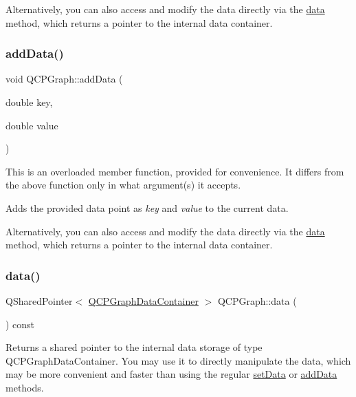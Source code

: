 Alternatively, you can also access and modify the data directly via the \hyperlink{classQCPGraph_a141aa31a1f19bbd0ce60f55eaeb9ea60}{data} method, which returns a pointer to the internal data container. \mbox{\label{classQCPGraph_a0bf98b1972286cfb7b1c4b7dd6ae2012}} 
\subsubsection{\texorpdfstring{add\+Data()}{addData()}\hspace{0.1cm}{\footnotesize\ttfamily [2/2]}}
{\footnotesize\ttfamily void Q\+C\+P\+Graph\+::add\+Data (\begin{DoxyParamCaption}\item[{double}]{key,  }\item[{double}]{value }\end{DoxyParamCaption})}

This is an overloaded member function, provided for convenience. It differs from the above function only in what argument(s) it accepts.

Adds the provided data point as {\itshape key} and {\itshape value} to the current data.

Alternatively, you can also access and modify the data directly via the \hyperlink{classQCPGraph_a141aa31a1f19bbd0ce60f55eaeb9ea60}{data} method, which returns a pointer to the internal data container. \mbox{\label{classQCPGraph_a141aa31a1f19bbd0ce60f55eaeb9ea60}} 
\subsubsection{\texorpdfstring{data()}{data()}}
{\footnotesize\ttfamily Q\+Shared\+Pointer$<$ \hyperlink{classQCPDataContainer}{Q\+C\+P\+Graph\+Data\+Container} $>$ Q\+C\+P\+Graph\+::data (\begin{DoxyParamCaption}{ }\end{DoxyParamCaption}) const\hspace{0.3cm}{\ttfamily [inline]}}

Returns a shared pointer to the internal data storage of type Q\+C\+P\+Graph\+Data\+Container. You may use it to directly manipulate the data, which may be more convenient and faster than using the regular \hyperlink{classQCPGraph_a1eae9429a316b008e2d99b2d65a54395}{set\+Data} or \hyperlink{classQCPGraph_ae0555c0d3fe0fa7cb8628f88158d420f}{add\+Data} methods. \mbox{\label{classQCPGraph_aac47c6189e3aea46ea46939e5d14796c}} 
